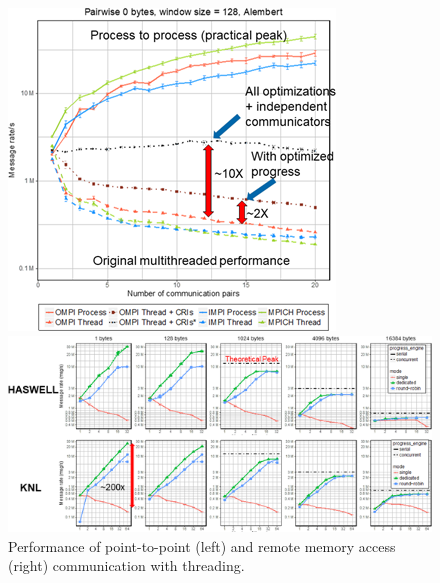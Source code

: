\begin{figure}
\centering
\begin{minipage}[c]{0.2\textwidth}
\captionsetup{width=\textwidth,font=small,labelfont=bf} %
\caption{Performance of point-to-point (left) and remote memory access
(right) communication with threading.} 
\label{fig:threading-performance}
\end{minipage}
\qquad
\begin{minipage}[c]{0.2\textwidth}
\includegraphics[width=\textwidth]{projects/2.3.1-PMR/2.3.1.17-OMPI-X/p2p-threading-performance.png}
\end{minipage}
\qquad
\begin{minipage}[c]{0.5\textwidth}
\includegraphics[width=\textwidth]{projects/2.3.1-PMR/2.3.1.17-OMPI-X/rma-threading-performance.png}
\end{minipage}
\end{figure}

